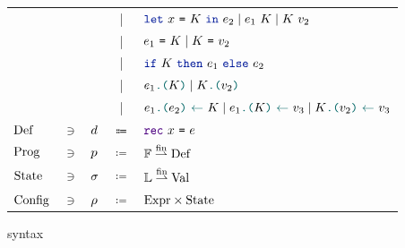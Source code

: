 \begin{figure}[tp]
\begin{tabular}{lclcl}
            &&
            & | &
            $\datalangLet{\datalangVar}{\datalangEctx}{\datalangExpr_2} \mid \datalangCall{\datalangExpr_1}{\datalangEctx} \mid \datalangCall{\datalangEctx}{\datalangVal_2}$
        \\
            &&
            & | &
            $\datalangEq{\datalangExpr_1}{\datalangEctx} \mid \datalangEq{\datalangEctx}{\datalangVal_2}$
        \\
            &&
            & | &
            $\datalangIf{\datalangEctx}{\datalangExpr_1}{\datalangExpr_2}$
        \\
            &&
            & | &
            $\datalangLoad{\datalangExpr_1}{\datalangEctx} \mid \datalangLoad{\datalangEctx}{\datalangVal_2}$
        \\
            &&
            & | &
            $\datalangStore{\datalangExpr_1}{\datalangExpr_2}{K} \mid \datalangStore{\datalangExpr_1}{\datalangEctx}{\datalangVal_3} \mid \datalangStore{\datalangEctx}{\datalangVal_2}{\datalangVal_3}$
        \\
            $\datalangDef[]$
            & $\ni$ &
            $\datalangDef$
            & $\Coloneqq$ &
            $\datalangRec{\datalangVar}{\datalangExpr}$
        \\
            $\datalangProg[]$
            & $\ni$ &
            $\datalangProg$
            & $\coloneqq$ &
            $\datalangFn[] \finmap \datalangDef[]$
        \\
            $\datalangState[]$
            & $\ni$ &
            $\datalangState$    
            & $\coloneqq$ &
            $\datalangLoc[] \finmap \datalangVal[]$
        \\
            $\datalangConfig[]$
            & $\ni$ &
            $\datalangConfig$
            & $\coloneqq$ &
            $\datalangExpr[] \times \datalangState[]$
    \end{tabular}
    \caption{\DataLang syntax}
    \label{fig:syntax}
\end{figure}
